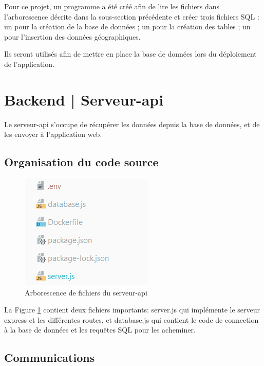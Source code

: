 \documentclass[
    iai, %
    il, %
]{heig-tb}
\begin{document}
Pour ce projet, un programme  a été créé afin de lire les fichiers dans l'arborescence décrite dans la sous-section précédente
et créer trois fichiers SQL : un pour la création de la base de données ; un pour la création des tables ; un pour l'insertion des données géographiques.

Ils seront utilisés afin de mettre en place la base de données lors du déploiement de l'application.

\section{Backend | Serveur-api}
Le serveur-api s'occupe de récupérer les données depuis la base de données, et de les envoyer à l'application web.

\subsection{Organisation du code source}

\begin{figure}[h]
    \centering
    \includegraphics[scale=0.9]{backend_source_code.png}
    \caption{Arborescence de fichiers du serveur-api}
    \label{fig:backend_source_files}
\end{figure}

La Figure \ref{fig:backend_source_files} contient deux fichiers importants: server.js qui implémente le serveur \gls{express} et les différentes routes,
et database.js qui contient le code de connection à la base de données et les requêtes SQL pour les acheminer.

\subsection{Communications}

\end{document}
